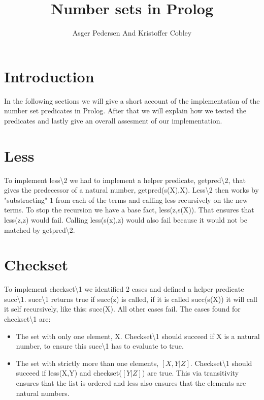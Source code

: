 \documentclass[]{article}
\title{Number sets in Prolog}
\author{ Asger Pedersen And Kristoffer Cobley}
\begin{document}
\ifpdf
{}
\else
{}
\fi

\maketitle
\setcounter{tocdepth}{1}
\tableofcontents
\newpage
\section{Introduction} %
\label{sec:introduction}
In the following sections we will give a short account of the implementation of the number set predicates in Prolog. After that we will explain how we tested the predicates and lastly give an overall assesment of our implementation.
\section{Less} %
\label{sec:less}
To implement less\textbackslash2 we had to implement a helper predicate, getpred\textbackslash2, that gives the predecessor of a natural number, getpred(s(X),X). Less\textbackslash2 then works by "substracting" 1 from each of the terms and calling less recursively on the new terms. To stop the recursion we have a base fact, less(z,s(X)). That ensures that less(z,z) would fail. Calling less(s(x),z) would also fail because it would not be matched by getpred\textbackslash2.
\section{Checkset} %
\label{sec:checkset}
To implement checkset\textbackslash1 we identified 2 cases and defined a helper predicate succ\textbackslash1. succ\textbackslash1 returns true if succ(z) is called, if it is called succ(s(X)) it will call it self recursively, like this: succ(X). All other cases fail. The cases found for checkset\textbackslash1 are:
\begin{itemize}
	\item The set with only one element, X. Checkset\textbackslash1 should succeed if X is a natural number, to ensure this succ\textbackslash1 has to evaluate to true.
	
	\item The set with strictly more than one elements, $[X,Y|Z]$. Checkset\textbackslash1 should succeed if less(X,Y) and checkset($[Y|Z]$) are true. This via transitivity ensures that the list is ordered and less also  ensures that the elements are natural numbers.
\end{itemize}	
\end{document}
